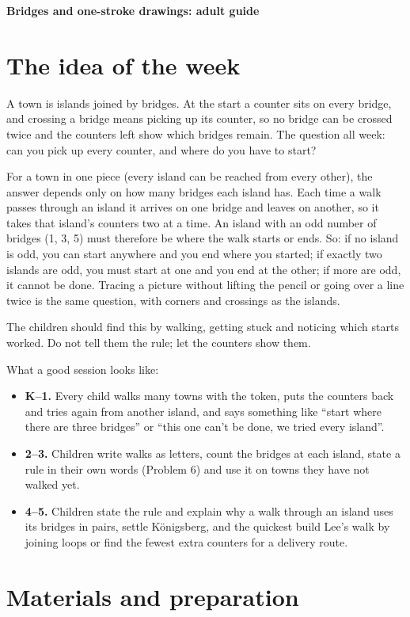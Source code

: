 \documentclass[10pt]{article}
\begin{document}
{\Large\bfseries Bridges and one-stroke drawings: adult guide}

\section{The idea of the week}

A town is islands joined by bridges. At the start a counter sits on every bridge, and crossing a bridge means picking up its counter, so no bridge can be crossed twice and the counters left show which bridges remain. The question all week: can you pick up every counter, and where do you have to start?

For a town in one piece (every island can be reached from every other), the answer depends only on how many bridges each island has. Each time a walk passes through an island it arrives on one bridge and leaves on another, so it takes that island's counters two at a time. An island with an odd number of bridges (1, 3, 5) must therefore be where the walk starts or ends. So: if no island is odd, you can start anywhere and you end where you started; if exactly two islands are odd, you must start at one and you end at the other; if more are odd, it cannot be done. Tracing a picture without lifting the pencil or going over a line twice is the same question, with corners and crossings as the islands.

The children should find this by walking, getting stuck and noticing which starts worked. Do not tell them the rule; let the counters show them.

What a good session looks like:
\begin{itemize}
\item \textbf{K--1.} Every child walks many towns with the token, puts the counters back and tries again from another island, and says something like ``start where there are three bridges'' or ``this one can't be done, we tried every island''.
\item \textbf{2--3.} Children write walks as letters, count the bridges at each island, state a rule in their own words (Problem 6) and use it on towns they have not walked yet.
\item \textbf{4--5.} Children state the rule and explain why a walk through an island uses its bridges in pairs, settle Königsberg, and the quickest build Lee's walk by joining loops or find the fewest extra counters for a delivery route.
\end{itemize}

\section{Materials and preparation}
\end{document}
